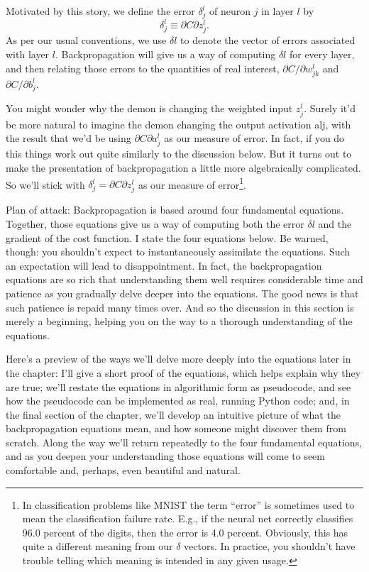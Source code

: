 \documentclass[a4paper,twoside,10pt]{book}
\begin{document}
Motivated by this story, we define the error $\delta^l_j$ of neuron $j$ in layer $l$ by
\begin{equation}
	\delta^l_j\equiv\partial{}C\partial{}z^l_j.\label{eq:29}
\end{equation}
As per our usual conventions, we use $\delta{}l$ to denote the vector of errors associated with layer $l$. Backpropagation will give us a way of computing $\delta{}l$ for every layer, and then relating those errors to the quantities of real interest, $\partial{}C/\partial{}w^l_{jk}$ and $\partial{}C/\partial{}b^l_j$.

You might wonder why the demon is changing the weighted input $z^l_j$. Surely it'd be more natural to imagine the demon changing the output activation alj, with the result that we'd be using $\partial{}C\partial{}a^l_j$ as our measure of error. In fact, if you do this things work out quite similarly to the discussion below. But it turns out to make the presentation of backpropagation a little more algebraically complicated. So we'll stick with $\delta^l_j=\partial{}C\partial{}z^l_j$ as our measure of error\footnote{In classification problems like MNIST the term ``error'' is sometimes used to mean the classification failure rate. E.g., if the neural net correctly classifies 96.0 percent of the digits, then the error is 4.0 percent. Obviously, this has quite a different meaning from our $\delta$ vectors. In practice, you shouldn't have trouble telling which meaning is intended in any given usage.}.

Plan of attack: Backpropagation is based around four fundamental equations. Together, those equations give us a way of computing both the error $\delta{}l$ and the gradient of the cost function. I state the four equations below. Be warned, though: you shouldn't expect to instantaneously assimilate the equations. Such an expectation will lead to disappointment. In fact, the backpropagation equations are so rich that understanding them well requires considerable time and patience as you gradually delve deeper into the equations. The good news is that such patience is repaid many times over. And so the discussion in this section is merely a beginning, helping you on the way to a thorough understanding of the equations.

Here's a preview of the ways we'll delve more deeply into the equations later in the chapter: I'll give a short proof of the equations, which helps explain why they are true; we'll restate the equations in algorithmic form as pseudocode, and see how the pseudocode can be implemented as real, running Python code; and, in the final section of the chapter, we'll develop an intuitive picture of what the backpropagation equations mean, and how someone might discover them from scratch. Along the way we'll return repeatedly to the four fundamental equations, and as you deepen your understanding those equations will come to seem comfortable and, perhaps, even beautiful and natural.
\end{document}
